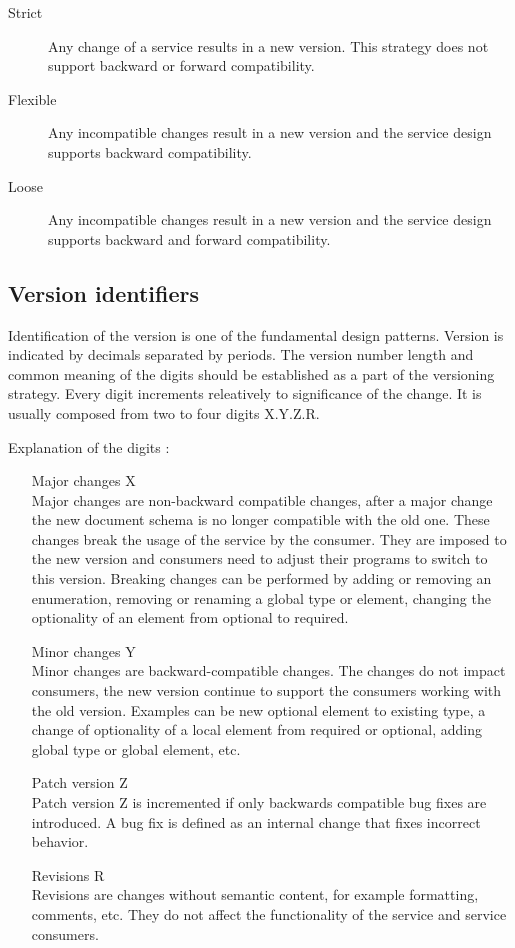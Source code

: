 \begin{description}
  \item[Strict] 
  Any change of a service results in a new version. This strategy does not support backward or forward compatibility.
  \item[Flexible]
  Any incompatible changes result in a new version and the service design supports backward compatibility.
  \item[Loose]
  Any incompatible changes result in a new version and the service design supports backward and forward compatibility.
\end{description}

\subsection{Version identifiers}
Identification of the version is one of the fundamental design patterns. Version is indicated by decimals separated by periods. The version number length and common meaning of the digits should be established as a part of the versioning strategy. Every digit increments releatively to significance of the change. It is usually composed from two to four digits X.Y.Z.R.

Explanation of the digits \cite{soa-governance}:

\begin{enumerate}
  \item[Major changes X] \hfill \\
  Major changes are non-backward compatible changes, after a major change the new document schema is no longer compatible with the old one. These changes break the usage of the service by the consumer. They are imposed to the new version and consumers need to adjust their programs to switch to this version. Breaking changes can be performed by adding or removing an enumeration, removing or renaming a global type or element, changing the optionality of an element from optional to required.
  
    \item[Minor changes Y] \hfill \\
  Minor changes are backward-compatible changes. The changes do not impact consumers, the new version continue to support the consumers working with the old version. Examples can be new optional element to existing type, a change of optionality of a local element from required or optional, adding global type or global element, etc.
  
  \item[Patch version Z] \hfill \\  
  Patch version Z is incremented if only backwards compatible bug fixes are introduced. A bug fix is defined as an internal change that fixes incorrect behavior.
  
  \item[Revisions R] \hfill \\  
  Revisions are changes without semantic content, for example formatting, comments, etc. They do not affect the functionality of the service and service consumers.
\end{enumerate} 

